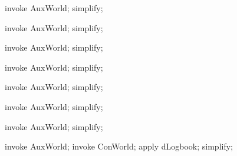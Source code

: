 \begin{LPScript}\begin{zproof}[lAuxWorldToInEpvExpansion]
    invoke AuxWorld;
    simplify;
\end{zproof}\end{LPScript}

\begin{LPScript}\begin{zproof}[lAuxWorldToInEapayeeExpansion]
    invoke AuxWorld;
    simplify;
\end{zproof}\end{LPScript}

\begin{LPScript}\begin{zproof}[lAuxWorldFromInEprExpansion]
    invoke AuxWorld;
    simplify;
\end{zproof}\end{LPScript}

\begin{LPScript}\begin{zproof}[lAuxWorldFromInEpaExpansion]
    invoke AuxWorld;
    simplify;
\end{zproof}\end{LPScript}

\begin{LPScript}\begin{zproof}[lAuxWorldAllLogsExpansion]
    invoke AuxWorld;
    simplify;
\end{zproof}\end{LPScript}

\begin{LPScript}\begin{zproof}[lAuxWorldDefinitelyLostExpansion]
    invoke AuxWorld;
    simplify;
\end{zproof}\end{LPScript}

\begin{LPScript}\begin{zproof}[lAuxWorldMaybeLostExpansion]
    invoke AuxWorld;
    simplify;
\end{zproof}\end{LPScript}

\begin{LPScript}\begin{zproof}[lAuxWorldArchiveExpansion]
    invoke AuxWorld;
    invoke ConWorld;
    apply dLogbook;
    simplify;
\end{zproof}\end{LPScript}

